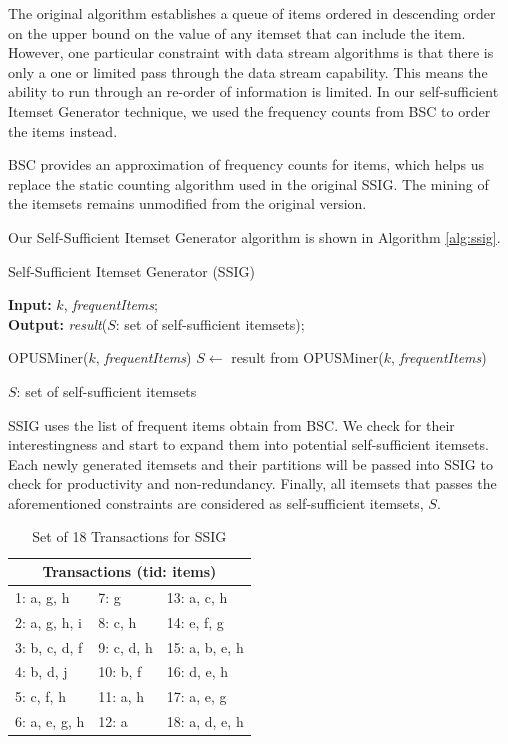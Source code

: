 The original algorithm establishes a queue of items ordered in descending order on the upper bound on the value of any itemset that can include the item. However, one particular constraint with data stream algorithms is that there is only a one or limited pass through the data stream capability. This means the ability to run through an re-order of information is limited. In our self-sufficient Itemset Generator technique, we used the frequency counts from BSC to order the items instead. 

BSC provides an approximation of frequency counts for items, which helps us replace the static counting algorithm used in the original SSIG. The mining of the itemsets remains unmodified from the original version. 


Our Self-Sufficient Itemset Generator algorithm is shown in Algorithm \ref{alg:ssig}.

\begin{algorithm}[h!]
\caption{Self-Sufficient Itemset Generator (SSIG)} 
\label{alg:ssig}
\hspace*{0.02in} {\bf Input:} 
$k$, \textit{frequentItems};\\
\hspace*{0.02in} {\bf Output:} 
\textit{result}($S$: set of self-sufficient itemsets);
\begin{algorithmic}[1]
\State OPUSMiner($k$, \textit{frequentItems})
\State $S \leftarrow$ result from OPUSMiner($k$, \textit{frequentItems})

\State \Return $S$: set of self-sufficient itemsets
\end{algorithmic}
\end{algorithm}


SSIG uses the list of frequent items obtain from BSC. We check for their interestingness and start to expand them into potential self-sufficient itemsets. Each newly generated itemsets and their partitions will be passed into SSIG to check for productivity and non-redundancy. Finally, all itemsets that passes the aforementioned constraints are considered as self-sufficient itemsets, $S$.

\begin{table}[H]
\caption{Set of 18 Transactions for SSIG}
\label{tb:tidlong}
\centering
 \begin{tabular}{p{4cm} p{4cm} p{4cm}}
 \hline\hline
 \multicolumn{3}{c}{Transactions (tid: items)}\\
 \hline
 1: a, g, h & 7: g & 13: a, c, h\\ 
 2: a, g, h, i & 8: c, h & 14: e, f, g\\
 3: b, c, d, f & 9: c, d, h & 15: a, b, e, h\\
 4: b, d, j & 10: b, f & 16: d, e, h\\
 5: c, f, h & 11: a, h & 17: a, e, g\\
 6: a, e, g, h & 12: a & 18: a, d, e, h\\
 \hline
\end{tabular}
\end{table}

